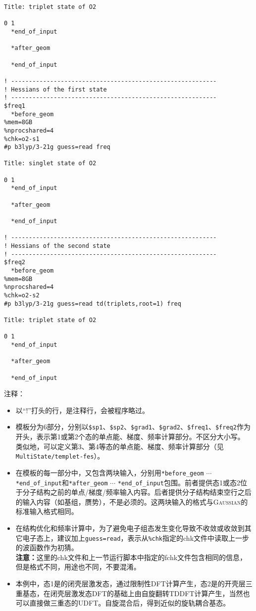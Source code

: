 \documentclass[UTF8]{ctexart}
\begin{document}
\begin{lstlisting}[alsoletter={$*},
morekeywords={$sp1,$grad1,$freq1,$sp2,$grad2,$freq2,*before_geom,*after_geom,*end_of_input}]
Title: triplet state of O2

0 1
  *end_of_input

  *after_geom

  *end_of_input

! ----------------------------------------------------------
! Hessians of the first state
! ----------------------------------------------------------
$freq1
  *before_geom
%mem=8GB
%nprocshared=4
%chk=o2-s1
#p b3lyp/3-21g guess=read freq

Title: singlet state of O2

0 1
  *end_of_input

  *after_geom

  *end_of_input

! ----------------------------------------------------------
! Hessians of the second state
! ----------------------------------------------------------
$freq2
  *before_geom
%mem=8GB
%nprocshared=4
%chk=o2-s2
#p b3lyp/3-21g guess=read td(triplets,root=1) freq

Title: triplet state of O2

0 1
  *end_of_input

  *after_geom

  *end_of_input

\end{lstlisting}
注释：
\begin{itemize}
\item 以``!''打头的行，是注释行，会被程序略过。
\item 模板分为6部分，分别以\verb|$sp1|、\verb|$sp2|、\verb|$grad1|、\verb|$grad2|、\verb|$freq1|、\verb|$freq2|作为开头，表示第1或第2个态的单点能、梯度、频率计算部分。不区分大小写。 \\
    类似地，可以定义第3、第4等态的单点能、梯度、频率计算部分（见\verb|MultiState/templet-fes|）。
\item 在模板的每一部分中，又包含两块输入，分别用\verb|*before_geom| $\cdots$ \verb|*end_of_input|和\verb|*after_geom| $\cdots$ \verb|*end_of_input|包围。前者提供态1或态2位于分子结构之前的单点/梯度/频率输入内容。后者提供分子结构结束空行之后的输入内容（如基组，赝势），不是必须的。这两块输入的格式与\textsc{Gaussian}的标准输入格式相同。
\item 在结构优化和频率计算中，为了避免电子组态发生变化导致不收敛或收敛到其它电子态上，建议加上\verb|guess=read|，表示从\verb|%chk|指定的chk文件中读取上一步的波函数作为初猜。 \\
    \textbf{注意：}这里的chk文件和上一节运行脚本中指定的fchk文件包含相同的信息，但是格式不同，用途也不同，不要混淆。
\item 本例中，态1是的闭壳层激发态，通过限制性DFT计算产生，态2是的开壳层三重基态，在闭壳层激发态DFT的基础上由自旋翻转TDDFT计算产生，当然也可以直接做三重态的UDFT。自旋混合后，得到近似的旋轨耦合基态。
\end{itemize}
\end{document}
